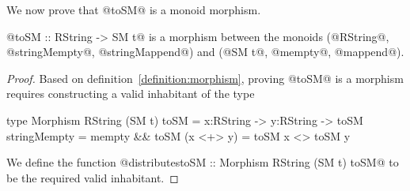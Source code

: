 We now prove that @toSM@ is a monoid morphism.
%
\begin{theorem}\label{theorem:smmorphism}
@toSM :: RString -> SM t@ is a morphism between the monoids
(@RString@, @stringMempty@, @stringMappend@) and (@SM t@, @mempty@, @mappend@).
\end{theorem}
\begin{proof}
Based on definition~\ref{definition:morphism}, proving @toSM@
is a morphism requires constructing a valid inhabitant of the type
\begin{code}
  type Morphism RString (SM t) toSM
    = x:RString -> y:RString
    -> {toSM stringMempty = mempty && toSM (x <+> y) = toSM x <> toSM y}
\end{code}
%
We define the function @distributestoSM :: Morphism RString (SM t) toSM@
to be the required valid inhabitant.


\end{proof}
